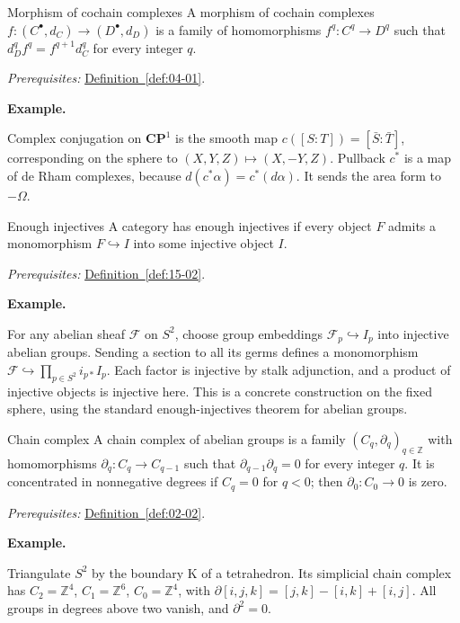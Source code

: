 \documentclass[11pt]{article}
\makeatletter
\newcounter{definition}
\newcommand{\CP}{\mathbf{CP}}
\newcommand{\Z}{\mathbb Z}
\newcommand{\exampleheading}{\par\medskip\textbf{Example.}\par\smallskip}
\newcommand{\currentdefinition}[1]{\protected@edef\@currentlabel{#1}}
\makeatother
\begin{document}
\begin{definitionbox}{Morphism of cochain complexes}
\currentdefinition{\thedefinition}
\label{def:05-01}
A morphism of cochain complexes $f:(C^\bullet,d_C)\to(D^\bullet,d_D)$ is a family of homomorphisms $f^q:C^q\to D^q$ such that $d_D^qf^q=f^{q+1}d_C^q$ for every integer $q$.

\smallskip
\textit{Prerequisites:} \hyperref[def:04-01]{Definition~\ref*{def:04-01}}.

\exampleheading
Complex conjugation on $\CP^1$ is the smooth map $c([S:T])=[\bar S:\bar T]$, corresponding on the sphere to $(X,Y,Z)\mapsto(X,-Y,Z)$. Pullback $c^*$ is a map of de Rham complexes, because $d(c^*\alpha)=c^*(d\alpha)$. It sends the area form to $-\Omega$.
\end{definitionbox}

\begin{definitionbox}{Enough injectives}
\currentdefinition{\thedefinition}
\label{def:15-03}
A category has enough injectives if every object $F$ admits a monomorphism $F\hookrightarrow I$ into some injective object $I$.

\smallskip
\textit{Prerequisites:} \hyperref[def:15-02]{Definition~\ref*{def:15-02}}.

\exampleheading
For any abelian sheaf $\mathcal F$ on $S^2$, choose group embeddings $\mathcal F_p\hookrightarrow I_p$ into injective abelian groups. Sending a section to all its germs defines a monomorphism $\mathcal F\hookrightarrow\prod_{p\in S^2}i_{p*}I_p$. Each factor is injective by stalk adjunction, and a product of injective objects is injective here. This is a concrete construction on the fixed sphere, using the standard enough-injectives theorem for abelian groups.
\end{definitionbox}

\begin{definitionbox}{Chain complex}
\currentdefinition{\thedefinition}
\label{def:23-01}
A chain complex of abelian groups is a family $(C_q,\partial_q)_{q\in\Z}$ with homomorphisms $\partial_q:C_q\to C_{q-1}$ such that $\partial_{q-1}\partial_q=0$ for every integer $q$. It is concentrated in nonnegative degrees if $C_q=0$ for $q<0$; then $\partial_0:C_0\to0$ is zero.

\smallskip
\textit{Prerequisites:} \hyperref[def:02-02]{Definition~\ref*{def:02-02}}.

\exampleheading
Triangulate $S^2$ by the boundary K of a tetrahedron. Its simplicial chain complex has $C_2=\Z^4$, $C_1=\Z^6$, $C_0=\Z^4$, with $\partial[i,j,k]=[j,k]-[i,k]+[i,j]$. All groups in degrees above two vanish, and $\partial^2=0$.
\end{definitionbox}
\end{document}
